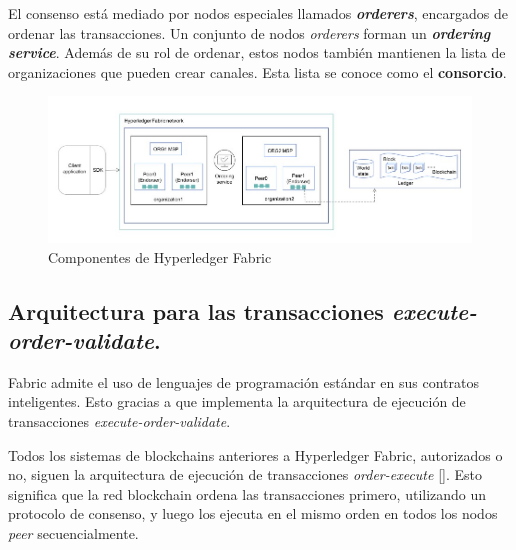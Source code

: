 El consenso está mediado por nodos especiales llamados \textit{\textbf{orderers}}, encargados de ordenar las transacciones. Un conjunto de nodos \textit{orderers} forman un \textbf{\textit{ordering service}}. Además de su rol de ordenar, estos nodos también mantienen la lista de organizaciones que pueden crear canales. Esta lista se conoce como el \textbf{consorcio}.


\begin{figure}[tbph]
\centering
\includegraphics[width=\textwidth]{Images/hlf_components}
\caption{Componentes de Hyperledger Fabric}
\label{fig:hlfcomponents}
\end{figure}


\subsection*{Arquitectura para las transacciones \textit{execute-order-validate}.}

Fabric admite el uso de lenguajes de programación estándar en sus contratos inteligentes. Esto gracias a que implementa la arquitectura de ejecución de transacciones \textit{execute-order-validate}.


Todos los sistemas de blockchains anteriores a Hyperledger Fabric, autorizados o no, siguen la arquitectura de ejecución de transacciones \textit{order-execute} [\cite{hlf-paper}]. Esto significa que la red blockchain ordena las transacciones primero, utilizando un protocolo de consenso, y luego los ejecuta en el mismo orden en todos los nodos \textit{peer} secuencialmente.

